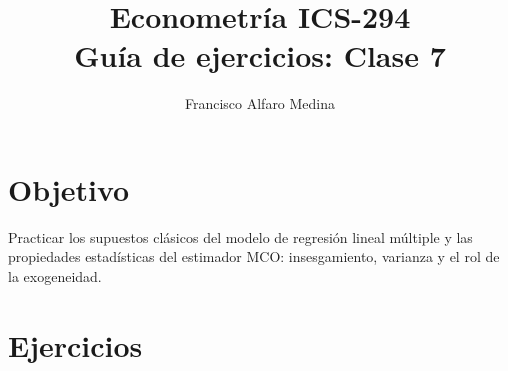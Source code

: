 \documentclass[11pt]{article}
\title{Econometría ICS-294\\Guía de ejercicios: Clase 7}
\author{Francisco Alfaro Medina}
\date{}
\begin{document}
\maketitle

\section*{Objetivo}

Practicar los supuestos clásicos del modelo de regresión lineal múltiple y las propiedades estadísticas del estimador MCO: insesgamiento, varianza y el rol de la exogeneidad.

\section*{Ejercicios}
\end{document}
